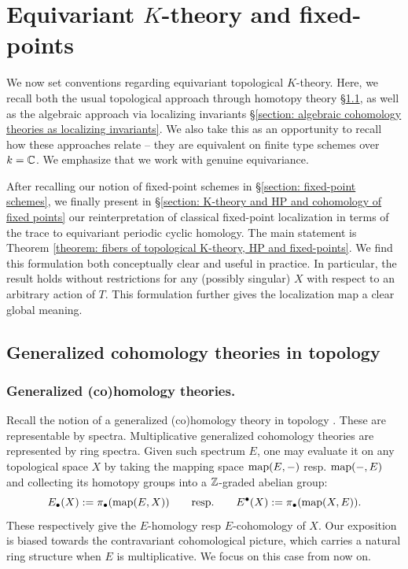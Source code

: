 \section{Equivariant \texorpdfstring{$K$}{K}-theory and fixed-points}\label{section: equivariant K-theory and fixed points}

We now set conventions regarding equivariant topological $K$-theory. Here, we recall both the usual topological approach through homotopy theory \S \ref{section: generalized cohomology theories in topology}, as well as the algebraic approach via localizing invariants \S \ref{section: algebraic cohomology theories as localizing invariants}. We also take this as an opportunity to recall how these approaches relate -- they are equivalent on finite type schemes over $k=\operatorname{\mathbb{C}}$. We emphasize that we work with genuine equivariance. 

After recalling our notion of fixed-point schemes in \S \ref{section: fixed-point schemes}, we finally present in \S \ref{section: K-theory and HP and cohomology of fixed points} our reinterpretation of classical fixed-point localization in terms of the trace to equivariant periodic cyclic homology. The main statement is Theorem \ref{theorem: fibers of topological K-theory, HP and fixed-points}. We find this formulation both conceptually clear and useful in practice. In particular, the result holds without restrictions for any (possibly singular) $X$ with respect to an arbitrary action of $T$. This formulation further gives the localization map a clear global meaning.






\subsection{Generalized cohomology theories in topology}\label{section: generalized cohomology theories in topology}



\subsubsection{Generalized (co)homology theories.}
Recall the notion of a generalized (co)homology theory in topology \cite{May96}. These are representable by spectra. Multiplicative generalized cohomology theories are represented by ring spectra. Given such spectrum $E$, one may evaluate it on any topological space $X$ by taking the mapping space $\operatorname{map}(E, -)$ resp. $\operatorname{map}(-, E)$ and collecting its homotopy groups into a $\operatorname{\mathbb{Z}}$-graded abelian group:
\begin{equation*}
    E_{\bullet}(X) := \pi_{\bullet}(\operatorname{map}(E, X)) \qquad \text{resp.} \qquad E^{\bullet}(X) := \pi_{\bullet}(\operatorname{map}(X, E)).
\end{equation*}
These respectively give the $E$-homology resp $E$-cohomology of $X$.
Our exposition is biased towards the contravariant cohomological picture, which carries a natural ring structure when $E$ is multiplicative. We focus on this case from now on.



